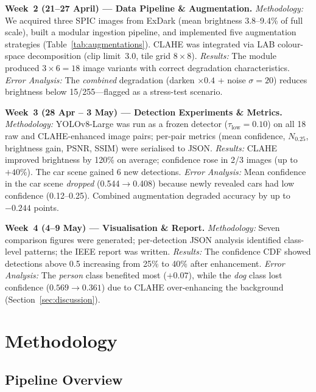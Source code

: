\documentclass[conference]{IEEEtran}
\begin{document}
\textbf{Week~2 (21--27 April) --- Data Pipeline \& Augmentation.}
\emph{Methodology:}
We acquired three SPIC images from ExDark (mean brightness
3.8--9.4\% of full scale), built a modular ingestion pipeline, and
implemented five augmentation strategies
(Table~\ref{tab:augmentations}).  CLAHE was integrated via LAB
colour-space decomposition (clip limit~3.0, tile grid $8{\times}8$).
\emph{Results:}
The module produced $3 \times 6 = 18$ image variants with correct
degradation characteristics.
\emph{Error Analysis:}
The \emph{combined} degradation (darken $\times 0.4$ + noise
$\sigma=20$) reduces brightness below 15/255---flagged as a
stress-test scenario.

\textbf{Week~3 (28 Apr -- 3 May) --- Detection Experiments \& Metrics.}
\emph{Methodology:}
YOLOv8-Large was run as a frozen detector ($\tau_{\text{low}}=0.10$)
on all 18 raw and CLAHE-enhanced image pairs; per-pair metrics
(mean confidence, $N_{0.25}$, brightness gain, PSNR, SSIM) were
serialised to JSON.
\emph{Results:}
CLAHE improved brightness by 120\% on average; confidence rose in
2/3 images (up to $+40$\%).  The car scene gained 6 new detections.
\emph{Error Analysis:}
Mean confidence in the car scene \emph{dropped} (0.544$\to$0.408)
because newly revealed cars had low confidence (0.12--0.25).
Combined augmentation degraded accuracy by up to $-0.244$ points.

\textbf{Week~4 (4--9 May) --- Visualisation \& Report.}
\emph{Methodology:}
Seven comparison figures were generated; per-detection JSON analysis
identified class-level patterns; the IEEE report was written.
\emph{Results:}
The confidence CDF showed detections above 0.5 increasing from
25\% to 40\% after enhancement.
\emph{Error Analysis:}
The \emph{person} class benefited most ($+0.07$), while the
\emph{dog} class lost confidence ($0.569 \to 0.361$) due to CLAHE
over-enhancing the background (Section~\ref{sec:discussion}).

\section{Methodology}
\label{sec:methodology}

\subsection{Pipeline Overview}
\end{document}
